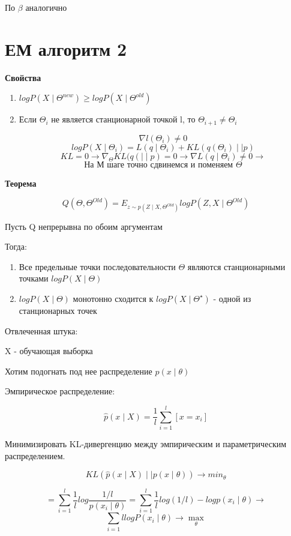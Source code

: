 \documentclass[a4paper, 12pt]{article}
\begin{document}
По $\beta$ аналогично

\section{ЕМ алгоритм 2}

\textbf{Свойства}

\begin{enumerate}
    \item \(logP(X \mid \Theta^{new}) \geq logP(X \mid \Theta^{old})\)
    \item Если $\Theta_{i}$ не является станционарной точкой l, 
    то $\Theta_{i + 1} \neq \Theta_{i}$

    \[\nabla l(\Theta_i) \neq 0\]
    \[logP(X \mid \Theta_i) = L(q \mid \Theta_i) + 
    KL(q(\Theta_i) \mid\mid p)\]
    \[KL = 0 \rightarrow 
    \nabla_{\Theta}KL(q( \mid \mid p) = 0 \rightarrow 
    \nabla L(q \mid \Theta_i) \neq 0 \rightarrow\]
    \[\textrm{На М шаге точно сдвинемся и поменяем }\Theta\]
\end{enumerate}

\textbf{Теорема}

\[Q(\Theta, \Theta^{Old}) = 
E_{z \sim p(Z \mid X, \Theta^{Old})}
logP(Z, X \mid \Theta^{Old})\]

Пусть Q непрерывна по обоим аргументам

Тогда:

\begin{enumerate}
    \item Все предельные точки последовательности $\Theta$
    являются станционарными точками $logP(X \mid \Theta)$
    \item $logP(X \mid \Theta)$ монотонно сходится к 
    $logP(X \mid \Theta^{\star})$ - одной из станционарных точек 
\end{enumerate}

Отвлеченная штука:

X - обучающая выборка

Хотим подогнать под нее распределение $p(x \mid \theta)$

Эмпирическое распределение:

\[\hat{p}(x \mid X) = \frac{1}{l}\sum^{l}_{i = 1}[x = x_i]\]

Минимизировать KL-дивергенцию между эмпирическим и 
параметрическим распределением.

\[KL(\hat{p}(x \mid X) \mid \mid p(x \mid \theta)) 
\rightarrow min_{\theta}\]

\[= \sum_{i = 1}^{l} 
\frac{1}{l}log  \frac{1 / l}{p(x_i \mid \theta)} = 
\sum_{i = 1}^{l} 
\frac{1}{l}log(1 / l) - logp(x_i \mid \theta) \rightarrow \]
\[\sum_{i = 1}{l} logP(x_i \mid \theta) \rightarrow \max_{\theta}\]
\end{document}
